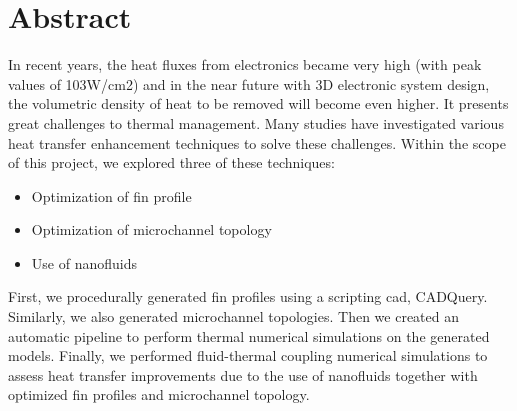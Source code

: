 \documentclass[../main.tex]{subfiles}
\begin{document}
\section{Abstract}

In recent years,
the heat fluxes from electronics became very high (with peak values of 103W/cm2)
and in the near future with 3D electronic system design,
the volumetric density of heat to be removed will become even higher.
It presents great challenges to thermal management.
Many studies have investigated various heat transfer enhancement techniques to solve these challenges.
Within the scope of this project, we explored three of these techniques:

\begin{itemize}
    \item Optimization of fin profile
    \item Optimization of microchannel topology
    \item Use of nanofluids
\end{itemize}

First, we procedurally generated fin profiles using a scripting cad, CADQuery.
Similarly,  we also generated microchannel topologies.
Then we created an automatic pipeline to perform thermal numerical simulations on the generated models.
Finally,  we performed fluid-thermal coupling numerical simulations to assess heat transfer improvements due to the use of nanofluids together with optimized fin profiles and microchannel topology.
\end{document}
